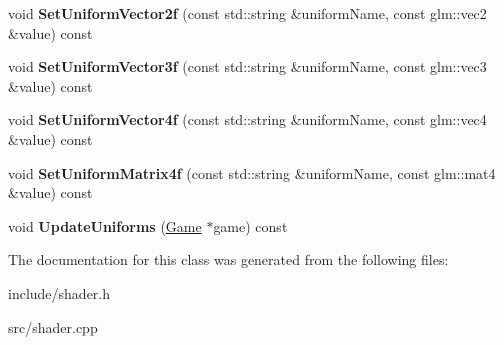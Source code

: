 \begin{DoxyCompactItemize}
\item 
\hypertarget{class_z_e_g_l_1_1_shader_aadf0e03f829b7bbe67a0884023e9a69c}{}void {\bfseries Set\+Uniform\+Vector2f} (const std\+::string \&uniform\+Name, const glm\+::vec2 \&value) const \label{class_z_e_g_l_1_1_shader_aadf0e03f829b7bbe67a0884023e9a69c}

\item 
\hypertarget{class_z_e_g_l_1_1_shader_ac7b409fed639970c5a8f31fa852ccd23}{}void {\bfseries Set\+Uniform\+Vector3f} (const std\+::string \&uniform\+Name, const glm\+::vec3 \&value) const \label{class_z_e_g_l_1_1_shader_ac7b409fed639970c5a8f31fa852ccd23}

\item 
\hypertarget{class_z_e_g_l_1_1_shader_a7565988acbbca758622449bb1c12b344}{}void {\bfseries Set\+Uniform\+Vector4f} (const std\+::string \&uniform\+Name, const glm\+::vec4 \&value) const \label{class_z_e_g_l_1_1_shader_a7565988acbbca758622449bb1c12b344}

\item 
\hypertarget{class_z_e_g_l_1_1_shader_aee412b7edeb22a93ec4672c0d0e59f4d}{}void {\bfseries Set\+Uniform\+Matrix4f} (const std\+::string \&uniform\+Name, const glm\+::mat4 \&value) const \label{class_z_e_g_l_1_1_shader_aee412b7edeb22a93ec4672c0d0e59f4d}

\item 
\hypertarget{class_z_e_g_l_1_1_shader_a7019b356d7a9322219cb6c2336e89372}{}void {\bfseries Update\+Uniforms} (\hyperlink{class_z_e_g_l_1_1_game}{Game} $\ast$game) const \label{class_z_e_g_l_1_1_shader_a7019b356d7a9322219cb6c2336e89372}

\end{DoxyCompactItemize}


The documentation for this class was generated from the following files\+:\begin{DoxyCompactItemize}
\item 
include/shader.\+h\item 
src/shader.\+cpp\end{DoxyCompactItemize}
